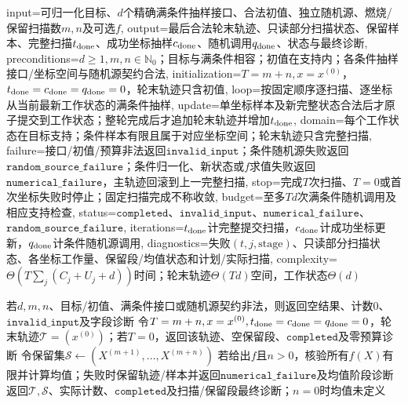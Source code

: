 \begin{AlgorithmContract}{
  input={可归一化目标、$d$个精确满条件抽样接口、合法初值、独立随机源、燃烧/保留扫描数$m,n$及可选$f$},
  output={最后合法轮末轨迹、只读部分扫描状态、保留样本、完整扫描$t_{\rm done}$、成功坐标抽样$c_{\rm done}$、随机调用$q_{\rm done}$、状态与最终诊断},
  preconditions={$d\ge1,m,n\in\mathbb N_0$；目标与满条件相容；初值在支持内；各条件抽样接口/坐标空间与随机源契约合法},
  initialization={$T=m+n,x=x^{(0)}$，$t_{\rm done}=c_{\rm done}=q_{\rm done}=0$，轮末轨迹只含初值},
  loop={按固定顺序逐扫描、逐坐标从当前最新工作状态的满条件抽样},
  update={单坐标样本及新完整状态合法后才原子提交到工作状态；整轮完成后才追加轮末轨迹并增加$t_{\rm done}$},
  domain={每个工作状态在目标支持；条件样本有限且属于对应坐标空间；轮末轨迹只含完整扫描},
  failure={接口/初值/预算非法返回$\mathtt{invalid\_input}$；条件随机源失败返回$\mathtt{random\_source\_failure}$；条件归一化、新状态或$f$求值失败返回$\mathtt{numerical\_failure}$，主轨迹回滚到上一完整扫描},
  stop={完成$T$次扫描、$T=0$或首次坐标失败时停止；固定扫描完成不称收敛},
  budget={至多$T d$次满条件随机调用及相应支持检查},
  status={$\mathtt{completed}$、$\mathtt{invalid\_input}$、$\mathtt{numerical\_failure}$、$\mathtt{random\_source\_failure}$},
  iterations={$t_{\rm done}$计完整提交扫描，$c_{\rm done}$计成功坐标更新，$q_{\rm done}$计条件随机源调用},
  diagnostics={失败$(t,j,\mathrm{stage})$、只读部分扫描状态、各坐标工作量、保留段/均值状态和计划/实际扫描},
  complexity={$\Theta(T\sum_j(C_j+U_j+d))$时间；轮末轨迹$\Theta(Td)$空间，工作状态$\Theta(d)$}
}
\begin{algorithm}[tbp]
\caption{带部分扫描诊断的系统Gibbs抽样}\label{alg:V5-C04-systematic-gibbs}
若$d,m,n$、目标/初值、满条件接口或随机源契约非法，则返回空结果、计数$0$、$\mathtt{invalid\_input}$及字段诊断\;
令$T=m+n,x=x^{(0)},t_{\rm done}=c_{\rm done}=q_{\rm done}=0$，轮末轨迹$\mathcal T=(x^{(0)})$；若$T=0$，返回该轨迹、空保留段、$\mathtt{completed}$及零预算诊断\;
令保留集$\mathcal S\leftarrow(X^{(m+1)},\ldots,X^{(m+n)})$\;
若给出$f$且$n>0$，核验所有$f(X)$有限并计算均值；失败时保留轨迹/样本并返回$\mathtt{numerical\_failure}$及均值阶段诊断\;
返回$\mathcal T,\mathcal S$、实际计数、$\mathtt{completed}$及扫描/保留段最终诊断；$n=0$时均值未定义\;
\end{algorithm}
\end{AlgorithmContract}
\endgroup

